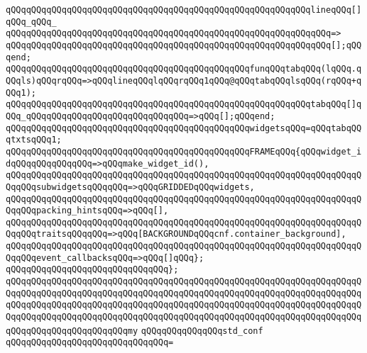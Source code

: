 \newline
\verb|qQQqqQQqqQQqqQQqqQQqqQQqqQQqqQQqqQQqqQQqqQQqqQQqqQQqqQQqqQQqlineqQQq[]qQQq_qQQq_|\newline
\verb|qQQqqQQqqQQqqQQqqQQqqQQqqQQqqQQqqQQqqQQqqQQqqQQqqQQqqQQqqQQqqQQq=>|\newline
\verb|qQQqqQQqqQQqqQQqqQQqqQQqqQQqqQQqqQQqqQQqqQQqqQQqqQQqqQQqqQQqqQQq[];qQQqend;|\newline
\newline
\verb|qQQqqQQqqQQqqQQqqQQqqQQqqQQqqQQqqQQqqQQqqQQqqQQqfunqQQqtabqQQq(lqQQq.qQQqls)qQQqrqQQq=>qQQqlineqQQqlqQQqrqQQq1qQQq@qQQqtabqQQqlsqQQq(rqQQq+qQQq1);|\newline
\verb|qQQqqQQqqQQqqQQqqQQqqQQqqQQqqQQqqQQqqQQqqQQqqQQqqQQqqQQqqQQqtabqQQq[]qQQq_qQQqqQQqqQQqqQQqqQQqqQQqqQQqqQQq=>qQQq[];qQQqend;|\newline
\newline
\verb|qQQqqQQqqQQqqQQqqQQqqQQqqQQqqQQqqQQqqQQqqQQqqQQqwidgetsqQQq=qQQqtabqQQqtxtsqQQq1;|\newline
\newline
\verb|qQQqqQQqqQQqqQQqqQQqqQQqqQQqqQQqqQQqqQQqqQQqqQQqFRAMEqQQq{qQQqwidget_idqQQqqQQqqQQqqQQq=>qQQqmake_widget_id(),|\newline
\verb|qQQqqQQqqQQqqQQqqQQqqQQqqQQqqQQqqQQqqQQqqQQqqQQqqQQqqQQqqQQqqQQqqQQqqQQqqQQqsubwidgetsqQQqqQQq=>qQQqGRIDDEDqQQqwidgets,|\newline
\verb|qQQqqQQqqQQqqQQqqQQqqQQqqQQqqQQqqQQqqQQqqQQqqQQqqQQqqQQqqQQqqQQqqQQqqQQqqQQqpacking_hintsqQQq=>qQQq[],|\newline
\verb|qQQqqQQqqQQqqQQqqQQqqQQqqQQqqQQqqQQqqQQqqQQqqQQqqQQqqQQqqQQqqQQqqQQqqQQqqQQqtraitsqQQqqQQq=>qQQq[BACKGROUNDqQQqcnf.container_background],|\newline
\verb|qQQqqQQqqQQqqQQqqQQqqQQqqQQqqQQqqQQqqQQqqQQqqQQqqQQqqQQqqQQqqQQqqQQqqQQqqQQqevent_callbacksqQQq=>qQQq[]qQQq};|\newline
\verb|qQQqqQQqqQQqqQQqqQQqqQQqqQQqqQQq};|\newline
\newline
\verb|qQQqqQQqqQQqqQQqqQQqqQQqqQQqqQQqqQQqqQQqqQQqqQQqqQQqqQQqqQQqqQQqqQQqqQQqqQQqqQQqqQQqqQQqqQQqqQQqqQQqqQQqqQQqqQQqqQQqqQQqqQQqqQQqqQQqqQQqqQQqqQQqqQQqqQQqqQQqqQQqqQQqqQQqqQQqqQQqqQQqqQQqqQQqqQQqqQQqqQQqqQQqqQQqqQQqqQQqqQQqqQQqqQQqqQQqqQQqqQQqqQQqqQQqqQQqqQQqqQQqqQQqqQQqqQQqqQQqqQQqqQQqqQQqqQQqqQQqqQQqqQQqmy|\newline
\verb|qQQqqQQqqQQqqQQqstd_conf|\newline
\verb|qQQqqQQqqQQqqQQqqQQqqQQqqQQqqQQq=|\newline
